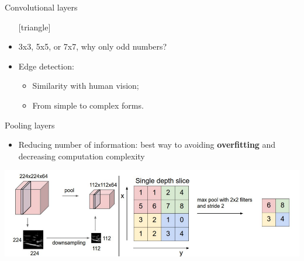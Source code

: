 \documentclass{beamer}
\begin{document}
\begin{frame}{Convolutional layers}
	\begin{itemize}
		\setlength\itemsep{1em}
		[triangle]
		\item 
			3x3, 5x5, or 7x7, why only odd numbers?
		\item 
			Edge detection:
			\begin{itemize}
				[circle]
				\item 
					Similarity with human vision;
				\item 
					From simple to complex forms.
			\end{itemize}
	\end{itemize}
\end{frame}

\begin{frame}{Pooling layers}
	\begin{itemize}
		\setlength\itemsep{1em}
		[triangle]
		\item 
			Reducing number of information: best way to avoiding \textbf{overfitting} and decreasing 							computation complexity
	\end{itemize}
	\includegraphics[scale=0.35]{pooling}
\end{frame}
\end{document}
